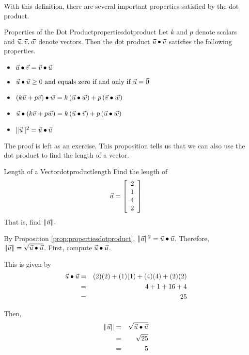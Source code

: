 With this definition, there are several important properties satisfied
by the dot product.

\begin{proposition}{Properties of the Dot Product}{propertiesdotproduct}
Let $k $ and $p $  denote scalars and $\vec{u},\vec{v},\vec{w}$ denote vectors.
Then the dot product $\vec{u} \bullet \vec{v}$ satisfies the following properties.
\begin{itemize}
\item
$\vec{u}\bullet \vec{v}= \vec{v}\bullet \vec{u} $
\item
$\vec{u}\bullet \vec{u}\geq 0 \mbox{ and equals zero if and only if }\vec{u}=\vec{0}$
\item
$\left( k\vec{u}+p\vec{v}\right) \bullet \vec{w}=k\left( \vec{u}\bullet \vec{w}\right) +p\left( \vec{v}\bullet \vec{w}\right)$
\item
$\vec{u}\bullet\left( k\vec{v}+p\vec{w}\right) =k\left(
\vec{u}\bullet \vec{v}\right) +p\left( \vec{u}\bullet \vec{w}\right)$
\item
$\| \vec{u}\| ^{2}=\vec{u}\bullet \vec{u} $
\end{itemize}
\end{proposition}

The proof is left as an exercise. This proposition tells us that we can also use the dot product to find the length of a vector.

\begin{example}{Length of a Vector}{dotproductlength}
Find the length of
\begin{equation*}
\vec{u}
=
\left[ 
\begin{array}{r}
2 \\
1 \\
4 \\
2
\end{array}
\right] 
\end{equation*}
 That is, find $\| \vec{u} \| .$
\end{example}

\begin{solution}
By Proposition \ref{prop:propertiesdotproduct},  $\| \vec{u} \| ^{2} = \vec{u} \bullet \vec{u}$. 
Therefore, $\| \vec{u} \| = \sqrt {\vec{u} \bullet \vec{u}}$.
First, compute $\vec{u} \bullet \vec{u}$. 

This is given by 
\begin{eqnarray*}
\vec{u} \bullet \vec{u}
&=&
(2)(2) + (1)(1) + (4)(4) + (2)(2) \\
&=&
4 + 1 + 16 + 4 \\
&=&
25
\end{eqnarray*}

Then, 
\begin{eqnarray*}
\| \vec{u} \| 
&=& \sqrt {\vec{u} \bullet \vec{u}} \\
&=& \sqrt{25} \\
&=& 5
\end{eqnarray*}
\end{solution}

